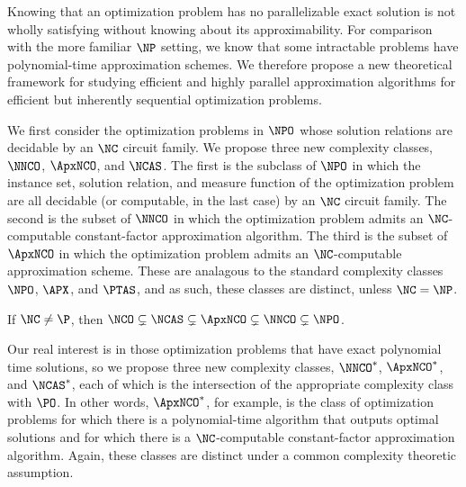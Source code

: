 \documentclass{article}
\begin{document}

Knowing that an optimization problem has no parallelizable exact solution is not wholly satisfying without knowing about its approximability.
For comparison with the more familiar $\NP$ setting, we know that some intractable problems have polynomial-time approximation schemes.
We therefore propose a new theoretical framework for studying efficient and highly parallel approximation algorithms for efficient but inherently sequential optimization problems. %

We first consider the optimization problems in $\NPO$ whose solution relations are decidable by an $\NC$ circuit family.
We propose three new complexity classes, $\NNCO$, $\ApxNCO$, and $\NCAS$.
The first is the subclass of $\NPO$ in which the instance set, solution relation, and measure function of the optimization problem are all decidable (or computable, in the last case) by an $\NC$ circuit family.
The second is the subset of $\NNCO$ in which the optimization problem admits an $\NC$-computable constant-factor approximation algorithm.
The third is the subset of $\ApxNCO$ in which the optimization problem admits an $\NC$-computable approximation scheme.
These are analagous to the standard complexity classes $\NPO$, $\APX$, and $\PTAS$, and as such, these classes are distinct, unless $\NC = \NP$.

\begin{theorem}
  If $\NC \neq \P$, then
  $\NCO \subsetneq \NCAS \subsetneq \ApxNCO \subsetneq \NNCO \subsetneq \NPO$.
\end{theorem}

Our real interest is in those optimization problems that have exact polynomial time solutions, so we propose three new complexity classes, $\NNCO^*$, $\ApxNCO^*$, and $\NCAS^*$, each of which is the intersection of the appropriate complexity class with $\PO$.
In other words, $\ApxNCO^*$, for example, is the class of optimization problems for which there is a polynomial-time algorithm that outputs optimal solutions and for which there is a $\NC$-computable constant-factor approximation algorithm.
Again, these classes are distinct under a common complexity theoretic assumption.
\end{document}
